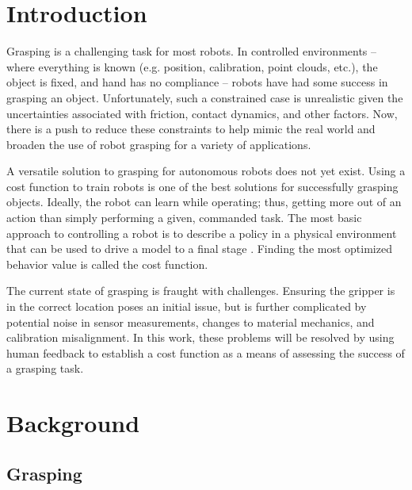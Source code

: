 \documentclass{article}
\begin{document}
\section{Introduction}


    Grasping is a challenging task for most robots.  In controlled environments -- where everything is known (e.g. position, calibration, point clouds, etc.), the object is fixed, and hand has no compliance -- robots have had some success in grasping an object.  Unfortunately, such a constrained case is unrealistic given the uncertainties associated with friction, contact dynamics, and other factors.  Now, there is a push to reduce these constraints to help mimic the real world and broaden the use of robot grasping for a variety of applications. 
    
    A versatile solution to grasping for autonomous robots does not yet exist.  Using a cost function to train robots is one of the best solutions for successfully grasping objects.  Ideally, the robot can learn while operating; thus, getting more out of an action than simply performing a given, commanded task.  The most basic approach to controlling a robot is to describe a policy in a physical environment that can be used to drive a model to a final stage \cite{byravan2017se3}.  Finding the most optimized behavior value is called the cost function.  
    
    The current state of grasping is fraught with challenges.  Ensuring the gripper is in the correct location poses an initial issue, but is further complicated by potential noise in sensor measurements, changes to material mechanics, and calibration misalignment.  In this work, these problems will be resolved by using human feedback to establish a cost function as a means of assessing the success of a grasping task. 
    
\section{Background} 

\subsection{Grasping}
\end{document}
